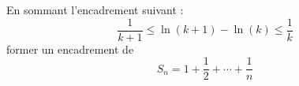 En sommant l'encadrement suivant :
\begin{displaymath}
 \dfrac{1}{k+1}\leq \ln(k+1) - \ln(k) \leq \dfrac{1}{k}
\end{displaymath}
former un encadrement de 
\begin{displaymath}
 S_n = 1+\dfrac{1}{2}+ \cdots +\dfrac{1}{n}
\end{displaymath} \bigskip\bigskip\bigskip
